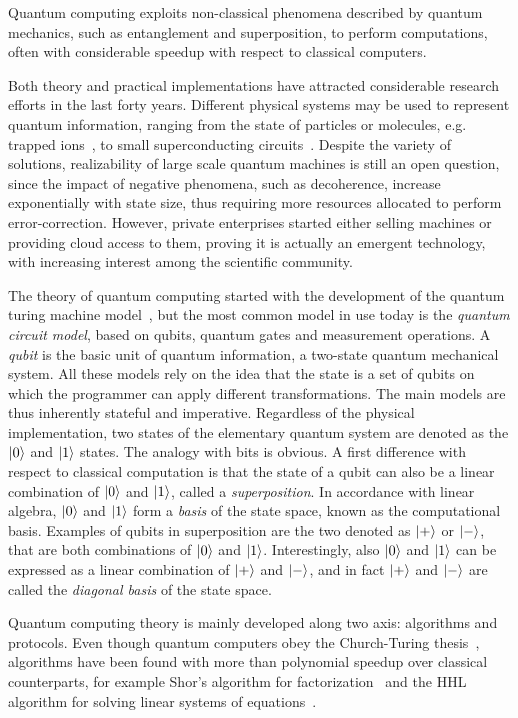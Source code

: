 Quantum computing exploits non-classical phenomena described by quantum
mechanics, such as entanglement and superposition, to perform computations,
 often with considerable speedup with respect to classical computers.

Both theory and practical implementations have attracted considerable research
efforts in the last forty years. Different physical systems may be used to represent
quantum information, ranging from the state of
particles or molecules, e.g. trapped ions~\cite{pogorelov_compact_2021}, to
small superconducting circuits~\cite{clarke_superconducting_2008}. Despite the
variety of solutions, realizability of large scale quantum machines is still an
open question, since the impact of negative phenomena, such as decoherence,
increase exponentially with state size, thus requiring more resources allocated to
perform error-correction. However, private enterprises started
either selling machines or providing cloud access to them, proving it is actually 
an emergent technology, with increasing interest among the scientific community.

The theory of quantum computing started with the development of the quantum
turing machine model~\cite{benioff_quantum_1982}, but the most common model in use today is the\textit{ quantum circuit model}, based on qubits, quantum gates and
measurement operations. A \textit{qubit} is the basic unit of quantum information, a two-state quantum mechanical system. All these models rely on the idea that the state is a set of qubits on which the programmer can apply different transformations. The main models are thus inherently stateful and imperative. 
Regardless of the physical implementation, two states of the elementary quantum system are denoted as the $\ket{0}$ and $\ket{1}$ states.
The analogy with bits is obvious. A first difference with respect to classical computation is that the state of a qubit can also be a linear combination of $\ket{0}$ and $\ket{1}$, called a \textit{superposition}. In accordance with linear algebra, $\ket{0}$ and $\ket{1}$ form a \textit{basis} of the state space, known as the computational basis. Examples of qubits in superposition are the two denoted as $\ket{+}$ or $\ket{-}$, that are both combinations of $\ket{0}$ and $\ket{1}$. Interestingly, also $\ket{0}$ and $\ket{1}$ can be expressed as a linear combination of $\ket{+}$ and $\ket{-}$, and in fact $\ket{+}$ and $\ket{-}$ are called the \textit{diagonal basis} of the state space. 

Quantum computing theory is mainly developed along two axis: algorithms and
protocols. Even though quantum computers obey the Church-Turing
thesis~\cite{nielsen_quantum_2010}, algorithms have been found with more
than polynomial speedup over classical counterparts, for example Shor's algorithm for
factorization~\cite{shor_algorithms_1994} and the HHL algorithm for solving
linear systems of equations~\cite{harrow_quantum_2009}.

